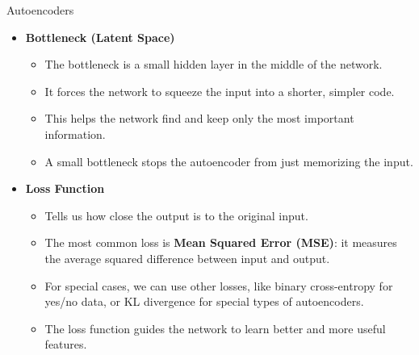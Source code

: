 \begin{frame}[allowframebreaks]{Autoencoders}
\framebreak

\begin{itemize}
    \setlength{\itemsep}{-0.2em}
        \item \textbf{Bottleneck (Latent Space)}
        \begin{itemize}
            \item The bottleneck is a small hidden layer in the middle of the network.
            \item It forces the network to squeeze the input into a shorter, simpler code.
            \item This helps the network find and keep only the most important information.
            \item A small bottleneck stops the autoencoder from just memorizing the input.
        \end{itemize}
        \item \textbf{Loss Function}
        \begin{itemize}
            \item Tells us how close the output is to the original input.
            \item The most common loss is \textbf{Mean Squared Error (MSE)}: it measures the average squared difference between input and output.
            \item For special cases, we can use other losses, like binary cross-entropy for yes/no data, or KL divergence for special types of autoencoders.
            \item The loss function guides the network to learn better and more useful features.
        \end{itemize}
\end{itemize}
\end{frame}